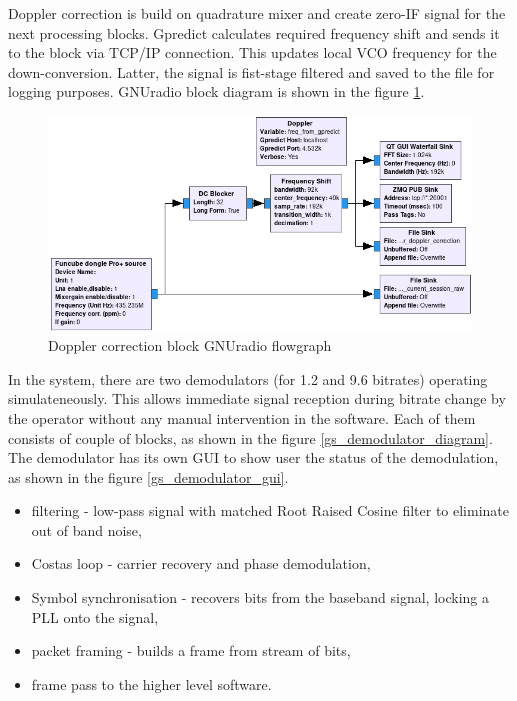 Doppler correction is build on quadrature mixer and create zero-IF signal for the next processing blocks. Gpredict calculates required frequency shift and sends it to the block via TCP/IP connection. This updates local VCO frequency for the down-conversion. Latter, the signal is fist-stage filtered and saved to the file for logging purposes. GNUradio block diagram is shown in the figure \ref{gs_doppler_gnuradio}.

\begin{figure}[H]
    \centering
    \includegraphics[width=0.6\paperwidth]{img/5/gs_doppler_gnuradio.png}
    \caption{Doppler correction block GNUradio flowgraph}
    \label{gs_doppler_gnuradio}
\end{figure}

In the system, there are two demodulators (for \SI{1.2}{\kbps} and \SI{9.6}{\kbps} bitrates) operating simulateneously. This allows immediate signal reception during bitrate change by the operator without any manual intervention in the software. Each of them consists of couple of blocks, as shown in the figure \ref{gs_demodulator_diagram}. The demodulator has its own GUI  to show user the status of the demodulation, as shown in the figure \ref{gs_demodulator_gui}.
\begin{itemize}
    \item filtering - low-pass signal with matched Root Raised Cosine filter to eliminate out of band noise,
    \item Costas loop - carrier recovery and phase demodulation,
    \item Symbol synchronisation - recovers bits from the baseband signal, locking a PLL onto the signal,
    \item packet framing - builds a frame from stream of bits,
    \item frame pass to the higher level software.
\end{itemize}

